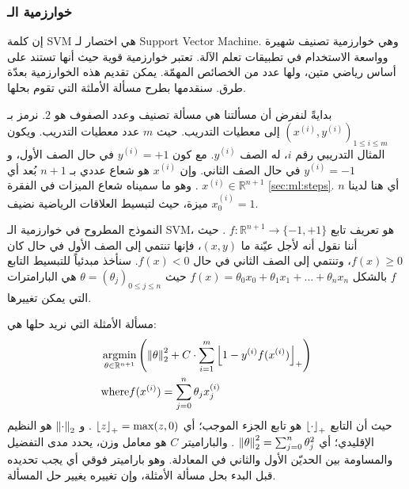 \subsubsection{خوارزمية الـ }
إن كلمة \textenglish{SVM} هي اختصار لـ \textenglish{Support Vector Machine}.
وهي خوارزمية تصنيف شهيرة وواسعة الاستخدام في تطبيقات تعلم الآلة.
تعتبر خوارزمية قوية حيث أنها تستند على أساس رياضي متين، ولها عدد من الخصائص المهمّة.
يمكن تقديم هذه الخوارزمية بعدّة طرق.
سنقدمها بطرح مسألة الأملثة التي تقوم بحلها.

بدايةً لنفرض أن مسألتنا هي مسألة تصنيف وعدد الصفوف هو $2$.
نرمز بـ
$(x^{(i)}, y^{(i)})_{1 \leq i \leq m}$
إلى معطيات التدريب.
حيث $m$ عدد معطيات التدريب.
ويكون المثال التدريبي رقم $i$، له الصف $ y^{(i)} $.
مع كون $ y^{(i)} = +1 $ في حال الصف الأول، و $ y^{(i)} = -1 $ في حال الصف الثاني.
وإن $ x^{(i)} $ هو شعاع عددي بـ $ n+1 $ بُعد أي
$ x^{(i)} \in \mathbb{R}^{n+1} $%
. وهو ما سميناه شعاع الميزات في الفقرة \ref{sec:ml:steps}.
أي هنا لدينا $n$ ميزة، حيث لتبسيط العلاقات الرياضية نضيف $ x^{(i)}_0 = 1 $.

النموذج المطروح في خوارزمية الـ \textenglish{SVM}، هو تعريف تابع 
$ f: \mathbb{R}^{n+1} \rightarrow \{-1, +1 \} $%
. حيث أننا نقول أنه لأجل عيّنة ما $ (x, y) $، فإنها تنتمي إلى الصف الأول في حال كان $ f(x) \geq 0 $،
وتنتمي إلى الصف الثاني في حال $ f(x) < 0 $.
سنأخذ مبدئياً للتبسيط التابع $f$ بالشكل
$ f(x) = \theta_0 x_0 + \theta_1 x_1 + \dots + \theta_n x_n $
حيث
$ \theta = (\theta_j)_{0 \leq j \leq n} $
هي البارامترات التي يمكن تغييرها.

مسألة الأمثلة التي نريد حلها هي:
\begin{align}
\label{eq:svm:primal}
&
\argmin_{\theta \in \mathbb{R}^{n+1} } \left(
\norm{\theta}^2 +
C \cdot \sum_{i = 1}^{m} \pospart{1 - y^{(i)} f(x^{(i)})}
\right)
\\
&
\mathrm{where}
f(x^{(i)}) = \sum_{j = 0}^{n} \theta_j x^{(i)}_j
\nonumber
\end{align}
حيث أن التابع
$\left\lfloor\cdot\right\rfloor_{+}$
هو تابع الجزء الموجب؛ أي
$ \left\lfloor z\right\rfloor_{+} = \max(z, 0) $%
. و
$ \left\lVert\cdot\right\rVert_{2} $
هو النظيم الإقليدي؛ أي
$ \left\lVert\theta\right\rVert_{2}^2 = \sum_{j=0}^{n} \theta_j^2 $%
. والباراميتر $C$ هو معامل وزن، يحدد مدى التفضيل والمساومة بين الحديّن الأول والثاني في المعادلة.
وهو باراميتر فوقي  أي يجب تحديده قبل البدء بحل مسألة الأمثلة، وإن تغييره يغيير حل المسألة.

